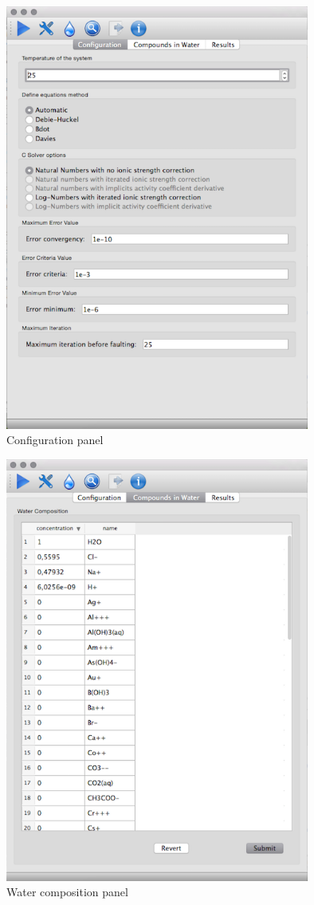 \documentclass[preprint,12pt,3p]{elsarticle}
\begin{document}
\begin{figure}[ht!]
\centering
\includegraphics[width=100mm]{shpeck-configtab.png}
\caption{Configuration panel}
\label{fig:config}
\end{figure}

\begin{figure}[ht!]
\centering
\includegraphics[width=100mm]{shpeck-watertab.png}
\caption{Water composition panel}
\label{fig:water}
\end{figure}
\end{document}
